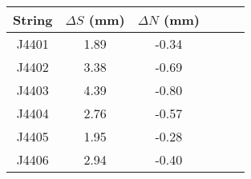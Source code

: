 \begin{tabular}{cccccc}
\toprule
String &  $\Delta S$ (mm) &  $\Delta N$ (mm) \\
\midrule
 J4401 &             1.89 &            -0.34 \\
 J4402 &             3.38 &            -0.69 \\
 J4403 &             4.39 &            -0.80 \\
 J4404 &             2.76 &            -0.57 \\
 J4405 &             1.95 &            -0.28 \\
 J4406 &             2.94 &            -0.40 \\
\bottomrule
\end{tabular}

